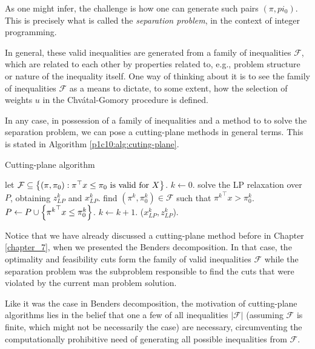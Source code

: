 As one might infer, the challenge is how one can generate such pairs $(\pi, pi_0)$. This is precisely what is called the \emph{separation problem}, in the context of integer programming.

In general, these valid inequalities are generated from a family of inequalities $\mathcal{F}$, which are related to each other by properties related to, e.g., problem structure or nature of the inequality itself. One way of thinking about it is to see the family of inequalities $\mathcal{F}$ as a means to dictate, to some extent, how the selection of weights $u$ in the Chv\'atal-Gomory procedure is defined.

In any case, in possession of a family of inequalities and a method to to solve the separation problem, we can pose a cutting-plane methods in general terms. This is stated in Algorithm \ref{p1c10:alg:cuting-plane}.

\begin{algorithm}[h]
	\caption{Cutting-plane algorithm} \label{p1c10:alg:cuting-plane}
	\begin{algorithmic}[1] %
		 let $\mathcal{F} \subseteq \left\{ (\pi, \pi_0) : \pi^\top  x \leq \pi_0 \text{ is valid for } X \right \}$. $k \gets 0$. 
		 \label{Alg2:loop}
		    \State solve the LP relaxation over $P$, obtaining $z_{LP}^k$ and $x_{LP}^k$. 
		        find $(\pi^k, \pi^k_0) \in \mathcal{F}$ such that ${\pi^k}^\top x > \pi^k_0$. \label{Alg2:SepProb}
		    \EndIf
		    \State $P \gets P \cup \left\{ {\pi^k}^\top x \leq \pi^k_0 \right \}$. $k \gets k+1$.
		\EndWhile
	     ($x_{LP}^k, z_{LP}^k$).
	\end{algorithmic}
\end{algorithm}

Notice that we have already discussed a cutting-plane method before in Chapter \ref{chapter_7}, when we presented the Benders decomposition. In that case, the optimality and feasibility cuts form the family of valid inequalities $\mathcal{F}$ while the separation problem was the subproblem responsible to find the cuts that were violated by the current man problem solution. 

Like it was the case in Benders decomposition, the motivation of cutting-plane algorithms lies in the belief that one a few of all inequalities $|\mathcal{F}|$ (assuming $\mathcal{F}$ is finite, which might not be necessarily the case) are necessary, circumventing the computationally prohibitive need of generating all possible inequalities from $\mathcal{F}$.

